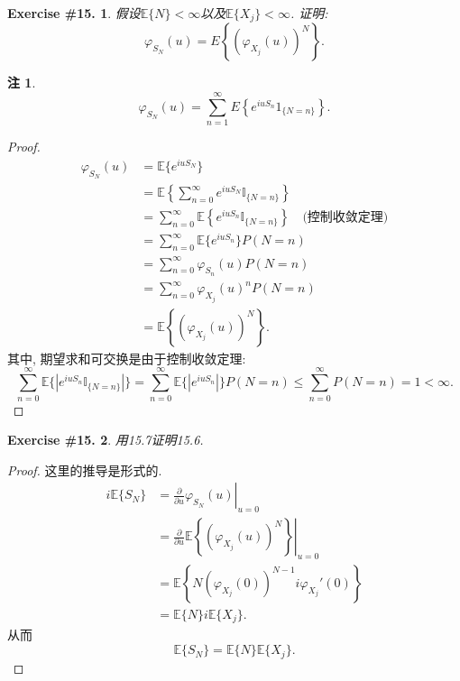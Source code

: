 \documentclass[UTF8, a4paper]{article}
\newtheorem{exercise}{Exercise \#15.}
\newtheorem*{remark}{注}
\begin{document}
\begin{framed}
\begin{exercise}
假设\(\mathbb{E}\{N\} < \infty\)以及\(\mathbb{E}\{X_j\} < \infty\).
证明:
$$
\varphi_{S_N}(u)=E\left\{\left(\varphi_{X_j}(u)\right)^N\right\} .
$$
\end{exercise}

\begin{remark}
$$
\varphi_{S_N}(u)=\sum_{n=1}^{\infty} E\left\{e^{i u S_n} 1_{\{N=n\}}\right\} .
$$
\end{remark}
\end{framed}

\begin{proof}
\begin{align*}
    \varphi_{S_N}(u) &= \mathbb{E}\{e^{i u S_N}\} \\
    &= \mathbb{E}\left\{\sum_{n=0}^{\infty} e^{i u S_N} \mathbb{I}_{\{N = n\}}\right\} \\
    &= \sum_{n=0}^{\infty} \mathbb{E}\left\{e^{i u S_n} \mathbb{I}_{\{N = n\}}\right\} \quad \text{(控制收敛定理)}\\
    &= \sum_{n=0}^{\infty} \mathbb{E}\{e^{i u S_n}\} P(N=n) \\
    &= \sum_{n=0}^{\infty} \varphi_{S_n}(u) P(N=n) \\
    &= \sum_{n=0}^{\infty} \varphi_{X_j}(u)^n P(N=n) \\
    &= \mathbb{E}\left\{\left(\varphi_{X_j}(u)\right)^N\right\}.
\end{align*}
其中, 期望求和可交换是由于控制收敛定理: 
$$
\sum_{n=0}^{\infty} \mathbb{E}\{|e^{i u S_n} \mathbb{I}_{\{N = n\}}|\} = \sum_{n=0}^{\infty} \mathbb{E}\{|e^{i u S_n}|\} P(N = n) \leq \sum_{n=0}^{\infty} P(N = n) = 1< \infty.
$$
\end{proof}


\begin{framed}
\begin{exercise}
用15.7证明15.6.
\end{exercise}
\end{framed}

\begin{proof}
这里的推导是形式的. 
$$
\begin{aligned}
    i \mathbb{E}\{S_N\} &= \left.\frac{\partial}{\partial u} \varphi_{S_N}(u) \right|_{u = 0} \\
    &= \left.\frac{\partial}{\partial u} \mathbb{E}\left\{\left(\varphi_{X_j}(u)\right)^N\right\} \right|_{u = 0} \\
    &= \mathbb{E}\left\{N\left(\varphi_{X_j}(0)\right)^{N-1}i\varphi_{X_j}'(0)\right\} \\
    &= \mathbb{E}\{N\}i\mathbb{E}\{X_j\}.
\end{aligned}
$$
从而
$$
\mathbb{E}\{S_N\} = \mathbb{E}\{N\}\mathbb{E}\{X_j\}.
$$
\end{proof}
\end{document}
